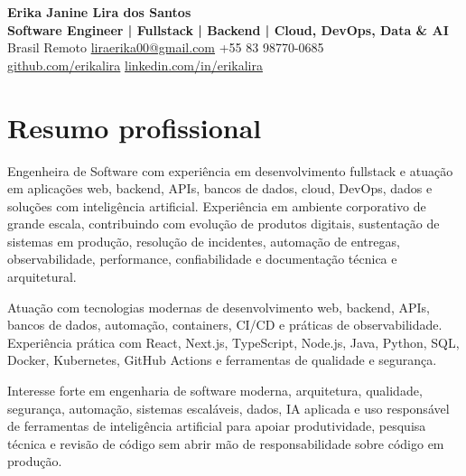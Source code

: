 \documentclass[10pt,a4paper]{article}
\begin{document}
{\LARGE \textbf{Erika Janine Lira dos Santos}}\\
\textbf{Software Engineer | Fullstack | Backend | Cloud, DevOps, Data \& AI}\\
Brasil \;\textbar\; Remoto \;\textbar\; \href{mailto:liraerika00@gmail.com}{liraerika00@gmail.com} \;\textbar\; +55 83 98770-0685\\
\href{https://github.com/erikalira}{github.com/erikalira} \;\textbar\; \href{https://www.linkedin.com/in/erikalira/}{linkedin.com/in/erikalira}

\section*{Resumo profissional}
Engenheira de Software com experiência em desenvolvimento fullstack e atuação em aplicações web, backend, APIs, bancos de dados, cloud, DevOps, dados e soluções com inteligência artificial. Experiência em ambiente corporativo de grande escala, contribuindo com evolução de produtos digitais, sustentação de sistemas em produção, resolução de incidentes, automação de entregas, observabilidade, performance, confiabilidade e documentação técnica e arquitetural.

Atuação com tecnologias modernas de desenvolvimento web, backend, APIs, bancos de dados, automação, containers, CI/CD e práticas de observabilidade. Experiência prática com React, Next.js, TypeScript, Node.js, Java, Python, SQL, Docker, Kubernetes, GitHub Actions e ferramentas de qualidade e segurança.

Interesse forte em engenharia de software moderna, arquitetura, qualidade, segurança, automação, sistemas escaláveis, dados, IA aplicada e uso responsável de ferramentas de inteligência artificial para apoiar produtividade, pesquisa técnica e revisão de código sem abrir mão de responsabilidade sobre código em produção.
\end{document}
